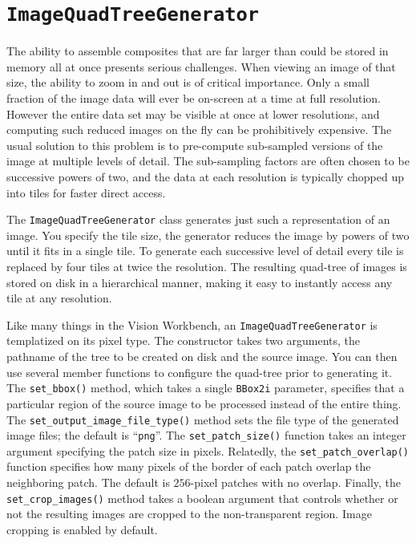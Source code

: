 \section{{\tt ImageQuadTreeGenerator}}\label{sec:quadtreegenerator}

The ability to assemble composites that are far larger than could be stored 
in memory all at once presents serious challenges.  When viewing an image 
of that size, the ability to zoom in and out is of critical importance.  
Only a small fraction of the image data will ever be on-screen at a time 
at full resolution.  However the entire data set may be visible at once at 
lower resolutions, and computing such reduced images on the fly can be 
prohibitively expensive.  The usual solution to this problem is to 
pre-compute sub-sampled versions of the image at multiple levels of detail. 
The sub-sampling factors are often chosen to be successive powers of two, 
and the data at each resolution is typically chopped up into tiles for 
faster direct access.

The \verb#ImageQuadTreeGenerator# class generates just such a representation 
of an image.  You specify the tile size, the generator reduces the 
image by powers of two until it fits in a single tile.  To generate 
each successive level of detail every tile is replaced by four tiles 
at twice the resolution.  The resulting quad-tree of images is stored 
on disk in a hierarchical manner, making it easy to instantly access any 
tile at any resolution.

Like many things in the Vision Workbench, an \verb#ImageQuadTreeGenerator# 
is templatized on its pixel type.  The constructor takes two arguments, 
the pathname of the tree to be created on disk and the source image. 
You can then use several member functions to configure the quad-tree 
prior to generating it.  The \verb#set_bbox()# method, which takes a 
single \verb#BBox2i# parameter, specifies that a particular region of 
the source image to be processed instead of the entire thing.  The 
\verb#set_output_image_file_type()# method sets the file type of the 
generated image files; the default is ``\verb#png#''.  The 
\verb#set_patch_size()# function takes an integer argument specifying 
the patch size in pixels.  Relatedly, the \verb#set_patch_overlap()# 
function specifies how many pixels of the border of each patch overlap 
the neighboring patch.  The default is $256$-pixel patches with no 
overlap.  Finally, the \verb#set_crop_images()# method takes a 
boolean argument that controls whether or not the resulting images 
are cropped to the non-transparent region.  Image cropping is enabled 
by default.

